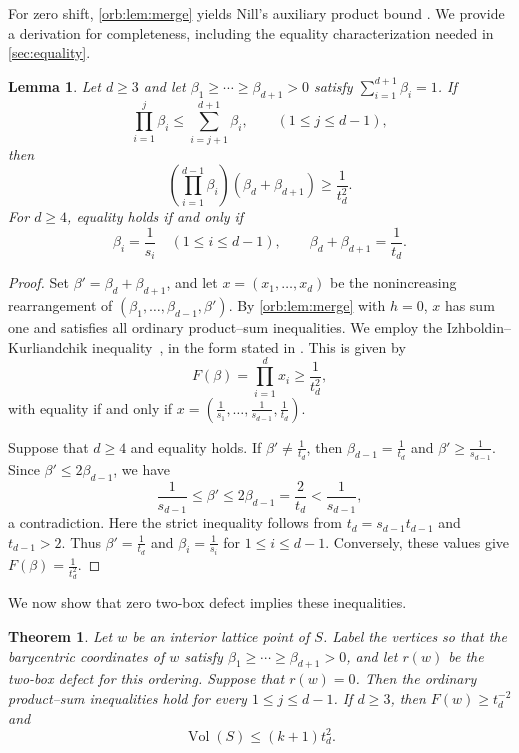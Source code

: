 \documentclass[reqno, 11pt]{article}
\numberwithin{equation}{section}
\newtheorem{theorem}{Theorem}[section]
\newtheorem{lemma}[lemma]{Lemma}
\theoremstyle{definition}
\begin{document}
For zero shift, \cref{orb:lem:merge} yields Nill's auxiliary product bound \cite[proof of Lemma~5.6, Part~II]{Nill07}. We provide a derivation for completeness, including the equality characterization needed in \cref{sec:equality}.

\begin{lemma}\label{geo:lem:ordinary}
Let $d\ge 3$ and let $\beta_1\ge\cdots\ge\beta_{d+1}>0$ satisfy $\sum_{i=1}^{d+1}\beta_i=1$. If
\[
 \prod_{i=1}^j\beta_i\le\sum_{i=j+1}^{d+1}\beta_i, \qquad (1\le j\le d-1),
\]
then
\[
 \left(\prod_{i=1}^{d-1}\beta_i\right)(\beta_d+\beta_{d+1}) \ge\frac1{t_d^2}.
\]
For $d\ge4$, equality holds if and only if
\[
 \beta_i=\frac{1}{s_i}\quad(1\le i\le d-1),\qquad \beta_d+\beta_{d+1}=\frac{1}{t_d}.
\]
\end{lemma}

\begin{proof}
Set $\beta'=\beta_d+\beta_{d+1}$, and let
$x=(x_1,\ldots,x_d)$ be the nonincreasing rearrangement of
$(\beta_1,\ldots,\beta_{d-1},\beta')$.
By \cref{orb:lem:merge} with $h=0$, $x$ has sum one and
satisfies all ordinary product--sum inequalities.
We employ the Izhboldin--Kurliandchik inequality~\cite{IK95}, in the form
stated in \cite[Lemma~5.3]{Nill07}. This is given by 
\[
F(\beta)=\prod_{i=1}^{d}x_i\ge\frac1{t_d^2},
\]
with equality if and only if
$x=\left(\frac1{s_1},\ldots,\frac1{s_{d-1}},\frac1{t_d}\right)$.

Suppose that $d\ge4$ and equality holds.
If $\beta'\ne\frac{1}{t_d}$, then $\beta_{d-1}=\frac{1}{t_d}$ and
$\beta'\ge\frac{1}{s_{d-1}}$.
Since $\beta'\le2\beta_{d-1}$, we have 
\[
\frac1{s_{d-1}}
\le\beta'
\le2\beta_{d-1}
=\frac2{t_d}
<\frac1{s_{d-1}},
\]
a contradiction.
Here the strict inequality follows from
$t_d=s_{d-1}t_{d-1}$ and $t_{d-1}>2$.
Thus $\beta'=\frac{1}{t_d}$ and
$\beta_i=\frac{1}{s_i}$ for $1\le i\le d-1$.
Conversely, these values give $F(\beta)=\frac{1}{t_d^2}$.
\end{proof}



We now show that zero two-box defect implies these inequalities.


\begin{theorem}\label{geo:subsec:defect}
Let $w$ be an interior lattice point of $S$. Label the vertices so that
the barycentric coordinates of $w$ satisfy
$\beta_1\ge\cdots\ge\beta_{d+1}>0$, and let $r(w)$ be the two-box defect
for this ordering. Suppose that $r(w)=0$. Then the ordinary product--sum
inequalities hold for every $1\le j\le d-1$. If $d\ge3$, then
$F(w)\ge t_d^{-2}$ and
\begin{equation}\label{geo:eq:rzero}
\operatorname{Vol}(S)\le(k+1)t_d^2.
\end{equation}
\end{theorem}
\end{document}
